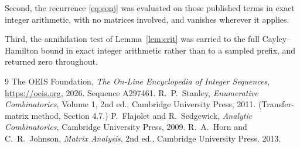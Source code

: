 \documentclass[11pt,a4paper]{article}
\theoremstyle{plain}
\theoremstyle{definition}
\begin{document}
Second, the recurrence \eqref{eq:conj} was evaluated on those published terms in exact
integer arithmetic, with no matrices involved, and vanishes wherever it applies.

Third, the annihilation test of Lemma~\ref{lem:crit} was carried to the full
Cayley--Hamilton bound in exact integer arithmetic rather than to a sampled prefix, and
returned zero throughout.

\begin{thebibliography}{9}
 The OEIS Foundation, \emph{The On-Line Encyclopedia of Integer
Sequences}, \url{https://oeis.org}, 2026. Sequence A297461.
 R.~P.~Stanley, \emph{Enumerative Combinatorics}, Volume 1, 2nd ed.,
Cambridge University Press, 2011. (Transfer-matrix method, Section 4.7.)
 P.~Flajolet and R.~Sedgewick, \emph{Analytic Combinatorics}, Cambridge
University Press, 2009.
 R.~A.~Horn and C.~R.~Johnson, \emph{Matrix Analysis}, 2nd ed., Cambridge
University Press, 2013.
\end{thebibliography}
\end{document}
